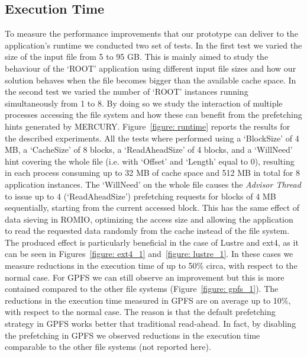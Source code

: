 \subsection{Execution Time}
\label{subsec: results}
To measure the performance improvements that our prototype can deliver to the application's runtime we conducted two set of tests. In the first test we varied the size of the input file from 5 to 95 GB. This is mainly aimed to study the behaviour of the 
`ROOT' application using different input file sizes and how our solution behaves when the file becomes bigger than the available cache space. In the second test we varied the number of `ROOT' instances running simultaneously from 1 to 8. By doing so we study 
the interaction of multiple processes accessing the file system and how these can benefit from the prefetching hints generated by MERCURY. Figure~\ref{figure: runtime} reports the results for the described experiments. All the tests where performed using 
a `BlockSize' of 4 MB, a `CacheSize' of 8 blocks, a `ReadAheadSize' of 4 blocks, and a `WillNeed' hint covering the whole file (i.e. with `Offset' and `Length' equal to 0), resulting in each process consuming up to 32 MB of cache space and 512 MB in total 
for 8 application instances. The `WillNeed' on the whole file causes the \textit{Advisor Thread} to issue up to 4 (`ReadAheadSize') prefetching requests for blocks of 4 MB sequentially, starting from the current accessed block. This has the same effect of 
data sieving in ROMIO, optimizing the access size and allowing the application to read the requested data randomly from the cache instead of the file system. The produced effect is particularly beneficial in the case of Lustre and ext4, as it can be seen 
in Figures~\ref{figure: ext4_1} and~\ref{figure: lustre_1}. In these cases we measure reductions in the execution time of up to 50\% circa, with respect to the normal case. For GPFS we can still observe an improvement but this is more contained compared 
to the other file systems (Figure~\ref{figure: gpfs_1}). The reductions in the execution time measured in GPFS are on average up to 10\%, with respect to the normal case. The reason is that the default prefetching strategy in GPFS works better that traditional 
read-ahead. In fact, by disabling the prefetching in GPFS we observed reductions in the execution time comparable to the other file systems (not reported here).

